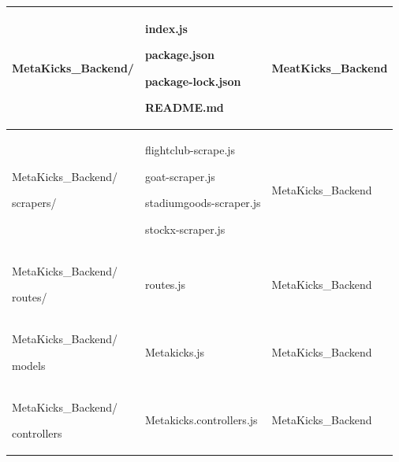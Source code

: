 \documentclass[conference]{IEEEtran}
\begin{document}
\begin{table}[h]
\begin{tabular}{|p{2.8cm}|p{2.4cm}|p{2.7cm}|}\hline
	MetaKicks\_Backend/ & index.js \par package.json \par package-lock.json \par README.md \par & MeatKicks\_Backend\\ \hline
	MetaKicks\_Backend/\par scrapers/ & flightclub-scrape.js \par goat-scraper.js \par stadiumgoods-scraper.js \par stockx-scraper.js & MetaKicks\_Backend\\ \hline
	MetaKicks\_Backend/\par routes/ & routes.js & MetaKicks\_Backend\\ \hline
	MetaKicks\_Backend/\par models & Metakicks.js & MetaKicks\_Backend\\ \hline
	MetaKicks\_Backend/\par controllers & Metakicks.controllers.js & MetaKicks\_Backend\\ \hline
	\end{tabular}
\end{table}
\end{document}
